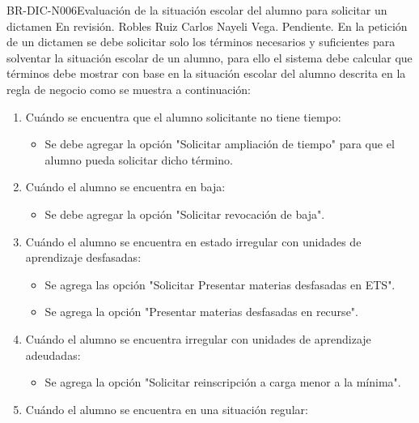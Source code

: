 \begin{BusinessRule}{BR-DIC-N006}{Evaluación de la situación escolar del alumno para solicitar un dictamen}{\bcAutorization}
	{\btEnabler}     %
{\blControlling}    %
	\BRItem[Estado] En revisión.
	 Robles Ruiz Carlos 	
	 Nayeli Vega.
	 Pendiente.
	\BRItem[Descripción] En la petición de un dictamen se debe solicitar solo los términos necesarios y suficientes para solventar la situación escolar de un alumno, para ello el sistema debe calcular que términos debe mostrar con base en la situación escolar del alumno descrita en la regla de negocio  como se muestra a continuación:
	\begin{enumerate}
		 \item Cuándo se encuentra que el alumno solicitante no tiene tiempo:
			 \begin{itemize}
			 \item Se debe agregar la opción "Solicitar ampliación de tiempo" para que el alumno pueda solicitar dicho término.
			 \end{itemize}
		\item Cuándo el alumno se encuentra en baja:
			\begin{itemize}
			 \item Se debe agregar la opción "Solicitar revocación de baja".
			 \end{itemize}
 		\item Cuándo el alumno se encuentra en estado irregular con unidades de aprendizaje desfasadas:
	 		\begin{itemize}
			 \item Se agrega las opción "Solicitar Presentar materias desfasadas en ETS".
			 \item Se agrega la opción "Presentar materias desfasadas en recurse".
			 \end{itemize}
		\item Cuándo el alumno se encuentra irregular con unidades de aprendizaje adeudadas:
			\begin{itemize}
			 \item Se agrega la opción "Solicitar reinscripción a carga menor a la mínima".
			 \end{itemize}
		\item Cuándo el alumno se encuentra en una situación regular:

\end{enumerate}
\end{BusinessRule}
